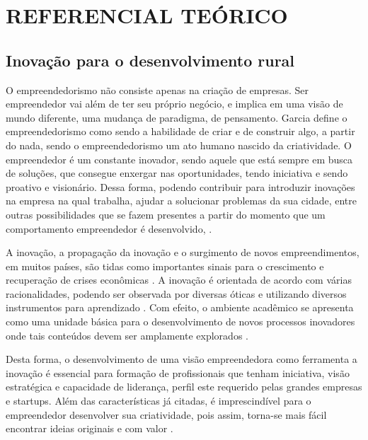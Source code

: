 \chapter{REFERENCIAL TEÓRICO}

\section{Inovação para o desenvolvimento rural}


O empreendedorismo não consiste apenas na criação de empresas. Ser empreendedor vai além de ter seu próprio negócio, e implica em uma visão de mundo diferente, uma mudança de paradigma, de pensamento. Garcia \cite{garcia_formacao_2000} define o empreendedorismo como sendo a habilidade de criar e de construir algo, a partir do nada, sendo o empreendedorismo um ato humano nascido da criatividade. O empreendedor é um constante inovador, sendo aquele que está sempre em busca de soluções, que consegue enxergar nas oportunidades, tendo iniciativa e sendo proativo e visionário. Dessa forma, podendo contribuir para introduzir inovações na empresa na qual trabalha, ajudar a solucionar problemas da sua cidade, entre outras possibilidades que se fazem presentes a partir do momento que um comportamento empreendedor é desenvolvido, \cite{alencar_intencao_2019, loiola_cao_2016}.

A inovação, a propagação da inovação e o surgimento de novos empreendimentos, em muitos países, são tidas como importantes sinais para o crescimento e recuperação de crises econômicas \cite{silva_educacao_2017}. A inovação é orientada de acordo com várias racionalidades, podendo ser observada por diversas óticas e utilizando diversos instrumentos para aprendizado \cite{munoz_innovacion_2016}. Com efeito, o ambiente acadêmico se apresenta como uma unidade básica para o desenvolvimento de novos processos inovadores onde tais conteúdos devem ser amplamente explorados \cite{costa_inovacao_2017}. 

Desta forma, o desenvolvimento de uma visão empreendedora como ferramenta a inovação é essencial para formação de profissionais que tenham iniciativa, visão estratégica e capacidade de liderança, perfil este requerido pelas grandes empresas e startups. Além das características já citadas, é imprescindível para o empreendedor desenvolver sua criatividade, pois assim, torna-se mais fácil encontrar ideias originais e com valor \cite{macedo_capital_2019}. 

